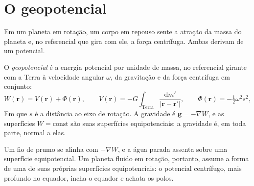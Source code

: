 \section{O geopotencial}

Em um planeta em rotação, um corpo em repouso sente a atração da massa do planeta
e, no referencial que gira com ele, a força centrífuga. Ambas derivam de um
potencial.

\begin{definition}[Geopotencial]\label{def:b3:gravity-geodesy:geopotential}
O \emph{geopotencial} é a energia potencial por unidade de
massa, no referencial girante com a Terra à velocidade angular $\omega$, da
gravitação e da força centrífuga em conjunto:
\[
  W(\mathbf r) = V(\mathbf r) + \Phi(\mathbf r),\qquad
  V(\mathbf r) = -G\int_{\text{Terra}}\frac{\mathrm dm'}{|\mathbf r - \mathbf r'|},\qquad
  \Phi(\mathbf r) = -\tfrac12\omega^2 s^2,
\]
Em que $s$ é a distância ao eixo de rotação. A gravidade é
$\mathbf g = -\nabla W$, e as superfícies $W = \text{const}$ são suas superfícies
equipotenciais: a gravidade é, em toda parte, normal a elas.
\end{definition}

Um fio de prumo se alinha com $-\nabla W$, e a água parada assenta sobre uma
superfície equipotencial. Um planeta fluido em rotação, portanto, assume a forma
de uma de suas próprias superfícies equipotenciais: o potencial centrífugo, mais
profundo no equador, incha o equador e achata os polos.

